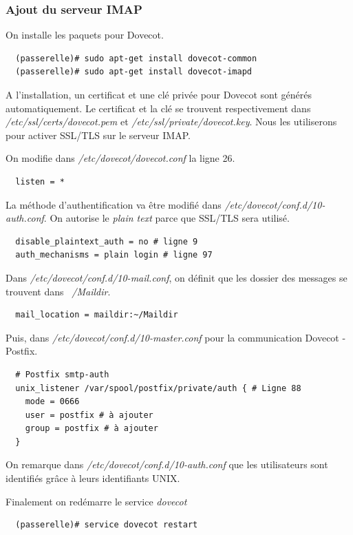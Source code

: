 \documentclass[a4paper]{article}
\begin{document}
\subsubsection{Ajout du serveur IMAP}

On installe les paquets pour Dovecot.
\begin{verbatim}
  (passerelle)# sudo apt-get install dovecot-common
  (passerelle)# sudo apt-get install dovecot-imapd
\end{verbatim}

A l'installation, un certificat et une clé privée pour Dovecot
sont générés automatiquement. Le certificat et la clé
se trouvent respectivement dans \textit{/etc/ssl/certs/dovecot.pem}
et \textit{/etc/ssl/private/dovecot.key}. Nous les utiliserons
pour activer SSL/TLS sur le serveur IMAP.

On modifie dans \textit{/etc/dovecot/dovecot.conf} la ligne 26.
\begin{verbatim}
  listen = *
\end{verbatim}

La méthode d'authentification va être modifié dans 
\textit{/etc/dovecot/conf.d/10-auth.conf}. 
On autorise le \textit{plain text} parce que
SSL/TLS sera utilisé.
\begin{verbatim}
  disable_plaintext_auth = no # ligne 9
  auth_mechanisms = plain login # ligne 97
\end{verbatim}

Dans \textit{/etc/dovecot/conf.d/10-mail.conf}, on
définit que les dossier des messages se trouvent 
dans \textit{~/Maildir}.
\begin{verbatim}
  mail_location = maildir:~/Maildir
\end{verbatim}

Puis, dans \textit{/etc/dovecot/conf.d/10-master.conf}
pour la communication Dovecot - Postfix.
\begin{verbatim}
  # Postfix smtp-auth
  unix_listener /var/spool/postfix/private/auth { # Ligne 88
    mode = 0666
    user = postfix # à ajouter
    group = postfix # à ajouter
  } 
\end{verbatim}

On remarque dans \textit{/etc/dovecot/conf.d/10-auth.conf} que
les utilisateurs sont identifiés grâce à leurs identifiants
UNIX.

Finalement on redémarre le service \textit{dovecot}
\begin{verbatim}
  (passerelle)# service dovecot restart 
\end{verbatim}
\end{document}
